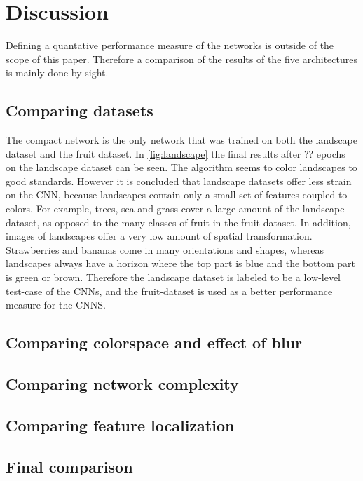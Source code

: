 \section{Discussion}

Defining a quantative performance measure of the networks is outside of the scope of this paper. Therefore a comparison of the results of the five architectures is mainly done by sight.

\subsection{Comparing datasets}
The compact network is the only network that was trained on both the landscape dataset and the fruit dataset. In \ref{fig:landscape} the final results after ?? epochs on the landscape dataset can be seen. The algorithm seems to color landscapes to good standards. However it is concluded that landscape datasets offer less strain on the CNN, because landscapes contain only a small set of features coupled to colors. For example, trees, sea and grass cover a large amount of the landscape dataset, as opposed to the many classes of fruit in the fruit-dataset. In addition, images of landscapes offer a very low amount of spatial transformation. Strawberries and bananas come in many orientations and shapes, whereas landscapes always have a horizon where the top part is blue and the bottom part is green or brown. Therefore the landscape dataset is labeled to be a low-level test-case of the CNNs, and the fruit-dataset is used as a better performance measure for the CNNS.

\subsection{Comparing colorspace and effect of blur}

\subsection{Comparing network complexity}

\subsection{Comparing feature localization}

\subsection{Final comparison}




